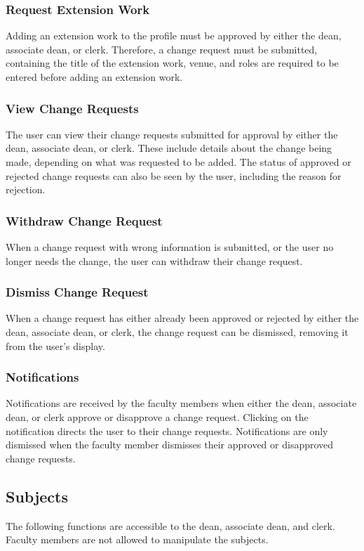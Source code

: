         \subsubsection{Request Extension Work}
        Adding an extension work to the profile must be approved by either the dean, associate dean, or clerk. Therefore, a change request must be submitted, containing the title of the extension work, venue, and roles are required to be entered before adding an extension work.
        
        \subsubsection{View Change Requests}
        The user can view their change requests submitted for approval by either the dean, associate dean, or clerk. These include details about the change being made, depending on what was requested to be added. The status of approved or rejected change requests can also be seen by the user, including the reason for rejection.
        
        \subsubsection{Withdraw Change Request}
        When a change request with wrong information is submitted, or the user no longer needs the change, the user can withdraw their change request.
        
        \subsubsection{Dismiss Change Request}
        When a change request has either already been approved or rejected by either the dean, associate dean, or clerk, the change request can be dismissed, removing it from the user's display.
        
        \subsubsection{Notifications}
        Notifications are received by the faculty members when either the dean, associate dean, or clerk approve or disapprove a change request. Clicking on the notification directs the user to their change requests. Notifications are only dismissed when the faculty member dismisses their approved or disapproved change requests.
    
    \subsection{Subjects}
    The following functions are accessible to the dean, associate dean, and clerk. Faculty members are not allowed to manipulate the subjects.
    
